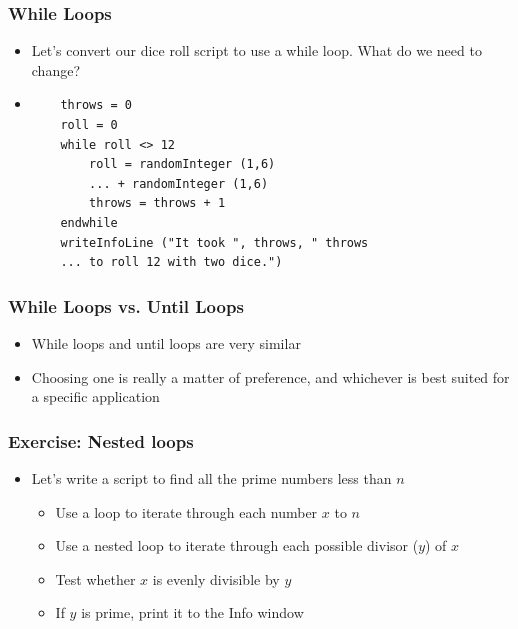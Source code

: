 \documentclass[handout]{beamer}
\begin{document}
\begin{frame}[fragile]
\frametitle{While Loops}

\begin{itemize}
    \item <1-> Let's convert our dice roll script to use a while loop. What do we need to change?

    \item <2-> 
    \begin{verbatim}
    throws = 0
    roll = 0
    while roll <> 12
        roll = randomInteger (1,6) 
        ... + randomInteger (1,6)
        throws = throws + 1
    endwhile
    writeInfoLine ("It took ", throws, " throws
    ... to roll 12 with two dice.")
    \end{verbatim}

\end{itemize}  
\end{frame}

\begin{frame}[fragile]
\frametitle{While Loops vs. Until Loops}

\begin{itemize}
    \item <1-> While loops and until loops are very similar

    \item <2-> Choosing one is really a matter of preference, and whichever is best suited for a specific application

\end{itemize}  
\end{frame}

\begin{frame}[fragile]
\frametitle{Exercise: Nested loops}

\begin{itemize}
    \item <1-> Let's write a script to find all the prime numbers less than $n$
    \begin{itemize}
        \item Use a loop to iterate through each number $x$ to $n$
        \item Use a nested loop to iterate through each possible divisor ($y$) of $x$
        \item Test whether $x$ is evenly divisible by $y$
        \item If $y$ is prime, print it to the Info window
    \end{itemize}

\end{itemize}  
\end{frame}
\end{document}
